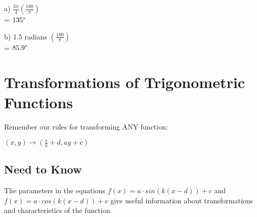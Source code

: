 \documentclass[11pt]{article}
\begin{document}
a) \(\frac{3\pi}{4}(\frac{180}{\pi})\)\\
= \(135\degree\)

b) 1.5 radians \((\frac{180}{\pi})\)\\
= \(85.9\degree\)

\section*{Transformations of Trigonometric Functions}
\label{sec:org9cc938b}

Remember our rules for transforming ANY function:

\((x,y) \rightarrow (\frac{x}{k} + d, ay + c)\)

\subsection*{Need to Know}
\label{sec:orgbd3cb79}

The parameters in the equations \(f(x) = a \cdot sin(k(x-d)) + c\) and \(f(x) = a \cdot cos(k(x-d)) + c\) give useful information about transformations and characteristics of the function.
\end{document}
